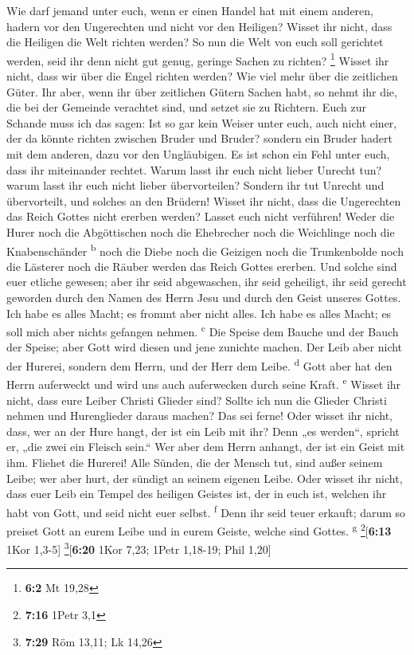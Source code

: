  Wie darf jemand unter euch, wenn er einen Handel hat mit
einem anderen, hadern vor den Ungerechten und nicht vor den Heiligen?
 Wisset ihr nicht, dass die Heiligen die Welt richten
werden? So nun die Welt von euch soll gerichtet werden, seid ihr denn
nicht gut genug, geringe Sachen zu richten? \footnote{\textbf{6:2} Mt
  19,28}  Wisset ihr nicht, dass wir über die Engel
richten werden? Wie viel mehr über die zeitlichen Güter. 
Ihr aber, wenn ihr über zeitlichen Gütern Sachen habt, so nehmt ihr die,
die bei der Gemeinde verachtet sind, und setzet sie zu Richtern.
 Euch zur Schande muss ich das sagen: Ist so gar kein
Weiser unter euch, auch nicht einer, der da könnte richten zwischen
Bruder und Bruder?  sondern ein Bruder hadert mit dem
anderen, dazu vor den Ungläubigen.  Es ist schon ein Fehl
unter euch, dass ihr miteinander rechtet. Warum lasst ihr euch nicht
lieber Unrecht tun? warum lasst ihr euch nicht lieber übervorteilen?
 Sondern ihr tut Unrecht und übervorteilt, und solches an
den Brüdern!  Wisset ihr nicht, dass die Ungerechten das
Reich Gottes nicht ererben werden? Lasset euch nicht verführen! Weder
die Hurer noch die Abgöttischen noch die Ehebrecher noch die Weichlinge
noch die Knabenschänder \textsuperscript{b}  noch die
Diebe noch die Geizigen noch die Trunkenbolde noch die Lästerer noch die
Räuber werden das Reich Gottes ererben.  Und solche sind
euer etliche gewesen; aber ihr seid abgewaschen, ihr seid geheiligt, ihr
seid gerecht geworden durch den Namen des Herrn Jesu und durch den Geist
unseres Gottes.  Ich habe es alles Macht; es frommt aber
nicht alles. Ich habe es alles Macht; es soll mich aber nichts gefangen
nehmen. \textsuperscript{c}  Die Speise dem Bauche und
der Bauch der Speise; aber Gott wird diesen und jene zunichte machen.
Der Leib aber nicht der Hurerei, sondern dem Herrn, und der Herr dem
Leibe. \textsuperscript{d}  Gott aber hat den Herrn
auferweckt und wird uns auch auferwecken durch seine Kraft.
\textsuperscript{e}  Wisset ihr nicht, dass eure Leiber
Christi Glieder sind? Sollte ich nun die Glieder Christi nehmen und
Hurenglieder daraus machen? Das sei ferne!  Oder wisset
ihr nicht, dass, wer an der Hure hangt, der ist ein Leib mit ihr? Denn
„es werden``, spricht er, „die zwei ein Fleisch sein.`` 
Wer aber dem Herrn anhangt, der ist ein Geist mit ihm. 
Fliehet die Hurerei! Alle Sünden, die der Mensch tut, sind außer seinem
Leibe; wer aber hurt, der sündigt an seinem eigenen Leibe.
 Oder wisset ihr nicht, dass euer Leib ein Tempel des
heiligen Geistes ist, der in euch ist, welchen ihr habt von Gott, und
seid nicht euer selbst. \textsuperscript{f}  Denn ihr
seid teuer erkauft; darum so preiset Gott an eurem Leibe und in eurem
Geiste, welche sind Gottes. \textsuperscript{g}
\footnote{\textbf{7:16} 1Petr 3,1}{[}\textbf{6:13} 1Kor 1,3-5{]}
\footnote{\textbf{7:29} Röm 13,11; Lk 14,26}{[}\textbf{6:20} 1Kor 7,23;
1Petr 1,18-19; Phil 1,20{]}

